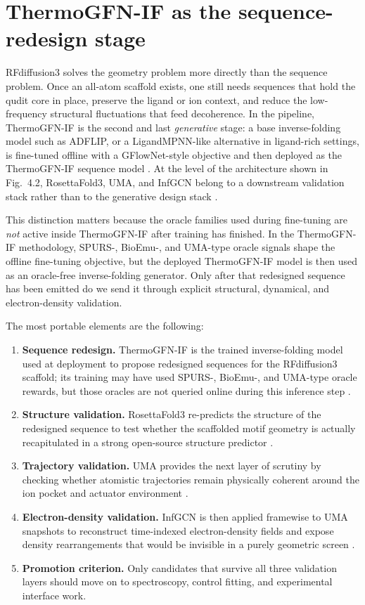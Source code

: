 \documentclass[11pt]{report}
\theoremstyle{definition}
\begin{document}
\section{ThermoGFN-IF as the sequence-redesign stage}
RFdiffusion3 solves the geometry problem more directly than the sequence problem. Once an all-atom scaffold exists, one still needs sequences that hold the qudit core in place, preserve the ligand or ion context, and reduce the low-frequency structural fluctuations that feed decoherence. In the pipeline, ThermoGFN-IF is the second and last \emph{generative} stage: a base inverse-folding model such as ADFLIP, or a LigandMPNN-like alternative in ligand-rich settings, is fine-tuned offline with a GFlowNet-style objective and then deployed as the ThermoGFN-IF sequence model \cite{thermogfnif2026}. At the level of the architecture shown in Fig.~4.2, RosettaFold3, UMA, and InfGCN belong to a downstream validation stack rather than to the generative design stack \cite{rf32025,uma2025,infgcn2023}.

This distinction matters because the oracle families used during fine-tuning are \emph{not} active inside ThermoGFN-IF after training has finished. In the ThermoGFN-IF methodology, SPURS-, BioEmu-, and UMA-type oracle signals shape the offline fine-tuning objective, but the deployed ThermoGFN-IF model is then used as an oracle-free inverse-folding generator. Only after that redesigned sequence has been emitted do we send it through explicit structural, dynamical, and electron-density validation.

The most portable elements are the following:

\begin{enumerate}[leftmargin=2em]
\item \textbf{Sequence redesign.} ThermoGFN-IF is the trained inverse-folding model used at deployment to propose redesigned sequences for the RFdiffusion3 scaffold; its training may have used SPURS-, BioEmu-, and UMA-type oracle rewards, but those oracles are not queried online during this inference step \cite{thermogfnif2026}.
\item \textbf{Structure validation.} RosettaFold3 re-predicts the structure of the redesigned sequence to test whether the scaffolded motif geometry is actually recapitulated in a strong open-source structure predictor \cite{rf32025}.
\item \textbf{Trajectory validation.} UMA provides the next layer of scrutiny by checking whether atomistic trajectories remain physically coherent around the ion pocket and actuator environment \cite{uma2025}.
\item \textbf{Electron-density validation.} InfGCN is then applied framewise to UMA snapshots to reconstruct time-indexed electron-density fields and expose density rearrangements that would be invisible in a purely geometric screen \cite{infgcn2023}.
\item \textbf{Promotion criterion.} Only candidates that survive all three validation layers should move on to spectroscopy, control fitting, and experimental interface work.
\end{enumerate}
\end{document}
